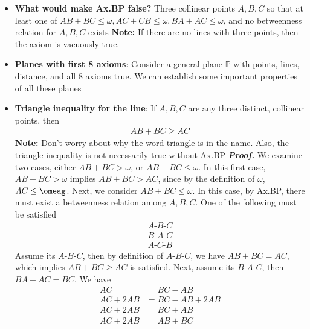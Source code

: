 \documentclass{report}
\begin{document}
\begin{itemize}
        \item \textbf{What would make Ax.BP false?} Three collinear points $A,B,C$ so that at least one of $AB + BC \leq \omega, AC + CB \leq \omega, BA + AC \leq \omega$, and no betweenness relation for $A,B,C$ exists
            \bigbreak \noindent 
            \textbf{Note:} If there are no lines with three points, then the axiom is vacuously true.
        \item \textbf{Planes with first 8 axioms}: Consider a general plane $\mathbb{P}$ with points, lines, distance, and all 8 axioms true. We can establish some important properties of all these planes
        \item \textbf{Triangle inequality for the line}: If $A,B,C$ are any three distinct, collinear points, then 
            \begin{align*}
                AB + BC \geq AC 
            \end{align*}
            \bigbreak \noindent 
            \textbf{Note:} Don't worry about why the word triangle is in the name. Also, the triangle inequality is not necessarily true without Ax.BP
            \bigbreak \noindent 
            \textbf{\textit{Proof.}} We examine two cases, either $ AB + BC > \omega$, or $AB + BC \leq \omega$. In this first case, $AB +BC > \omega$ implies $AB +BC > AC$, since by the definition of $\omega$, $AC \leq \omeag$.
            \bigbreak \noindent 
            Next, we consider $AB + BC \leq \omega$. In this case, by Ax.BP, there must exist a betweenness relation among $A,B,C$. One of the following must be satisfied
            \begin{align*}
                A\text{-}B\text{-}C \\
                B\text{-}A\text{-}C \\
                A\text{-}C\text{-}B
            \end{align*}
            \bigbreak \noindent 
            Assume its $ A\text{-}B\text{-}C$, then by definition of $ A\text{-}B\text{-}C$, we have $AB + BC = AC$, which implies $AB + BC \geq AC$ is satisfied.
            \bigbreak \noindent 
            Next, assume its $ B\text{-}A\text{-}C$, then $BA + AC = BC$. We have
            \begin{align*}
                AC &= BC - AB \\
                AC + 2AB &= BC - AB + 2AB \\
                AC + 2AB &= BC + AB \\
                AC + 2AB &= AB + BC
            \end{align*}

\end{itemize}
\end{document}
